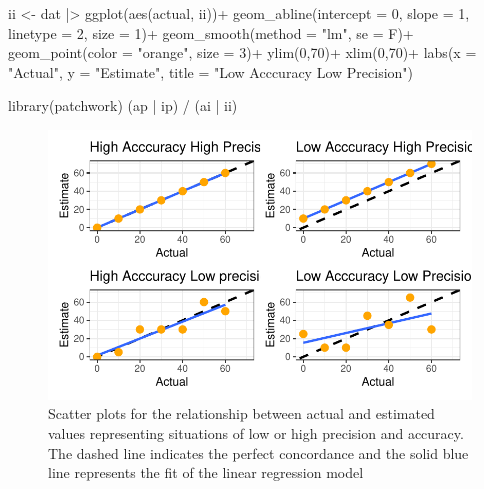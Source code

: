 \documentclass[
  letterpaper,
  DIV=11,
  numbers=noendperiod]{scrreprt}
\newenvironment{Shaded}{\begin{snugshade}}{\end{snugshade}}
\newcommand{\AttributeTok}[1]{\textcolor[rgb]{0.40,0.45,0.13}{#1}}
\newcommand{\DecValTok}[1]{\textcolor[rgb]{0.68,0.00,0.00}{#1}}
\newcommand{\FunctionTok}[1]{\textcolor[rgb]{0.28,0.35,0.67}{#1}}
\newcommand{\NormalTok}[1]{\textcolor[rgb]{0.00,0.23,0.31}{#1}}
\newcommand{\OtherTok}[1]{\textcolor[rgb]{0.00,0.23,0.31}{#1}}
\newcommand{\SpecialCharTok}[1]{\textcolor[rgb]{0.37,0.37,0.37}{#1}}
\newcommand{\StringTok}[1]{\textcolor[rgb]{0.13,0.47,0.30}{#1}}
\begin{document}
\begin{Shaded}
\begin{Highlighting}[]
\NormalTok{ii }\OtherTok{\textless{}{-}}\NormalTok{ dat }\SpecialCharTok{|\textgreater{}} 
  \FunctionTok{ggplot}\NormalTok{(}\FunctionTok{aes}\NormalTok{(actual, ii))}\SpecialCharTok{+}
  \FunctionTok{geom\_abline}\NormalTok{(}\AttributeTok{intercept =} \DecValTok{0}\NormalTok{, }\AttributeTok{slope =} \DecValTok{1}\NormalTok{, }
              \AttributeTok{linetype =} \DecValTok{2}\NormalTok{, }\AttributeTok{size =} \DecValTok{1}\NormalTok{)}\SpecialCharTok{+}
  \FunctionTok{geom\_smooth}\NormalTok{(}\AttributeTok{method =} \StringTok{"lm"}\NormalTok{, }\AttributeTok{se =}\NormalTok{ F)}\SpecialCharTok{+}
  \FunctionTok{geom\_point}\NormalTok{(}\AttributeTok{color =} \StringTok{"orange"}\NormalTok{, }\AttributeTok{size =} \DecValTok{3}\NormalTok{)}\SpecialCharTok{+}
  \FunctionTok{ylim}\NormalTok{(}\DecValTok{0}\NormalTok{,}\DecValTok{70}\NormalTok{)}\SpecialCharTok{+}
  \FunctionTok{xlim}\NormalTok{(}\DecValTok{0}\NormalTok{,}\DecValTok{70}\NormalTok{)}\SpecialCharTok{+}
  \FunctionTok{labs}\NormalTok{(}\AttributeTok{x =} \StringTok{"Actual"}\NormalTok{, }\AttributeTok{y =} \StringTok{"Estimate"}\NormalTok{,}
       \AttributeTok{title =} \StringTok{"Low Acccuracy Low Precision"}\NormalTok{)}

\FunctionTok{library}\NormalTok{(patchwork)}
\NormalTok{(ap }\SpecialCharTok{|}\NormalTok{ ip) }\SpecialCharTok{/}\NormalTok{ (ai }\SpecialCharTok{|}\NormalTok{ ii)}
\end{Highlighting}
\end{Shaded}

\begin{figure}[H]

{\centering \includegraphics{data-accuracy_files/figure-pdf/fig-accuracy-1.pdf}

}

\caption{\label{fig-accuracy}Scatter plots for the relationship between
actual and estimated values representing situations of low or high
precision and accuracy. The dashed line indicates the perfect
concordance and the solid blue line represents the fit of the linear
regression model}

\end{figure}
\end{document}
